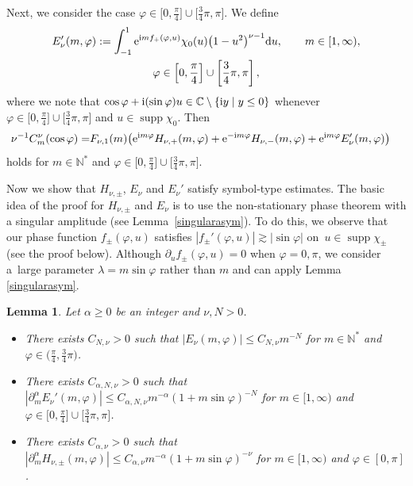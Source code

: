 \documentclass[pdftex]{sigma}
\numberwithin{equation}{section}
\newtheorem{Lemma}[Theorem]{Lemma}
\DeclareMathOperator{\supp}{supp}%
\def\a{\alpha}
\def\f{\varphi}
\def\l{\lambda}
\def\n{\nu}
\def\pa{\partial}
\begin{document}
Next, we consider the case $\f\in \bigl[0,\frac{\pi}{4}\bigr]\cup \bigl[\frac{3}{4}\pi,\pi\bigr]$. We define
\begin{gather*}
E_{\n}'(m,\f):=\int_{-1}^1{\rm e}^{{\rm i}mf_{+}(\f,u)}\chi_{0}(u)\bigl(1-u^2\bigr)^{\n-1}{\rm d}u,\qquad m\in [1,\infty),\\ \f\in \left[0,\frac{\pi}{4}\right]\cup \left[\frac{3}{4}\pi,\pi\right],
\end{gather*}
where we note that $\cos \f+{\rm i}(\sin\f)u\in \mathbb{C}\setminus \{{\rm i}y\mid y\leq 0\}$ whenever $\f\in \bigl[0,\frac{\pi}{4}\bigr]\cup \bigl[\frac{3}{4}\pi,\pi\bigr]$ and $u\in \supp \chi_0$. Then
\begin{align}\label{Gegendecom2}
\n^{-1}C_m^{\n}(\cos\f)=&F_{\n,1}(m)\bigl({\rm e}^{{\rm i}m\f}H_{\n,+}(m,\f)+{\rm e}^{-{\rm i}m\f}H_{\n,-}(m,\f)+{\rm e}^{{\rm i}m\f}E_{\n}'(m,\f) \bigr)
\end{align}
holds for $m\in\mathbb{N}^*$ and $\f\in \bigl[0,\frac{\pi}{4}\bigr]\cup \bigl[\frac{3}{4}\pi,\pi\bigr]$.

Now we show that $H_{\n,\pm}$, $E_{\n}$ and $E_{\n}'$ satisfy symbol-type estimates. The basic idea of the proof for $H_{\n,\pm}$ and $E_{\n}$ is to use the non-stationary phase theorem with a singular amplitude (see Lemma~\ref{singularasym}). To do this, we observe that our phase function $f_{\pm}(\f,u)$ satisfies $|f_{\pm}'(\f,u)|\gtrsim |\sin \f|$ on~${u\in \supp \chi_{\pm}}$ (see the proof below). Although $\pa_u f_{\pm}(\f,u)=0$ when $\f=0,\pi$, we consider a~large parameter $\l=m\sin \f$ rather than $m$ and can apply Lemma \ref{singularasym}.

\begin{Lemma}\label{Gegenlemma}
Let $\a\geq 0$ be an integer and $\n,N>0$.
\begin{itemize}\itemsep=0pt
\item[$(i)$] There exists $C_{N,\n}>0$ such that $|E_{\n}(m,\f)|\leq C_{N,\n}m^{-N}$ for $m\in\mathbb{N}^*$ and $\f\in \bigl(\frac{\pi}{4}, \frac{3}{4}\pi\bigr)$.

\item[$(ii)$] There exists $C_{\a,N,\n}>0$ such that $|\pa_{m}^{\a}E_{\n}'(m,\f)|\leq C_{\a,N,\n}m^{-\a}(1+m\sin\f)^{-N}$ for $m\in[1,\infty)$ and $\f\in \bigl[0,\frac{\pi}{4}\bigr]\cup \bigl[\frac{3}{4}\pi,\pi\bigr]$.

\item[$(iii)$] There exists $C_{\a,\n}>0$ such that $|\pa_{m}^{\a}H_{\n,\pm}(m,\f)|\leq C_{\a,\n}m^{-\a}(1+m\sin\f)^{-\n}$ for $m\in[1,\infty)$ and $\f\in [0,\pi]$.
\end{itemize}
\end{Lemma}
\end{document}
